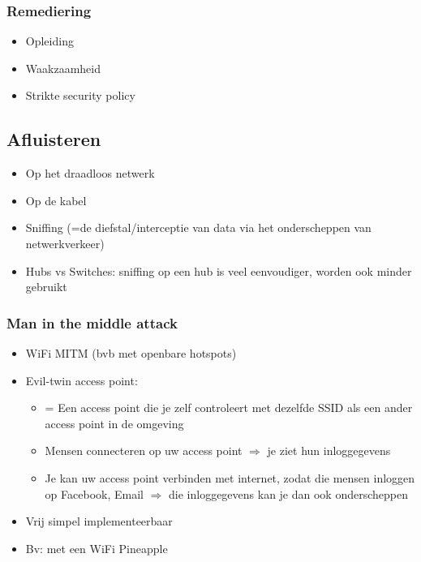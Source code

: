\documentclass{article}
\begin{document}
\subsubsection{Remediering}

\begin{itemize}
    \item Opleiding
    \item Waakzaamheid
    \item Strikte security policy
\end{itemize}

\subsection{Afluisteren}

\begin{itemize}
    \item Op het draadloos netwerk
    \item Op de kabel
    \item Sniffing (=de diefstal/interceptie van data via het onderscheppen van netwerkverkeer)
    \item Hubs vs Switches: sniffing op een hub is veel eenvoudiger, worden ook minder gebruikt
\end{itemize}


\subsubsection{Man in the middle attack}

\begin{itemize}
    \item WiFi MITM (bvb met openbare hotspots)
    \item Evil-twin access point: 
    \begin{itemize}
        \item = Een access point die je zelf controleert met dezelfde SSID als een ander access point in de omgeving
        \item Mensen connecteren op uw access point $\Rightarrow$ je ziet hun inloggegevens 
        \item Je kan uw access point verbinden met internet, zodat die mensen inloggen op Facebook, Email $\Rightarrow$ die inloggegevens kan je dan ook onderscheppen
    \end{itemize} 
    \item Vrij simpel implementeerbaar
    \item Bv: met een WiFi Pineapple
\end{itemize}
\end{document}
